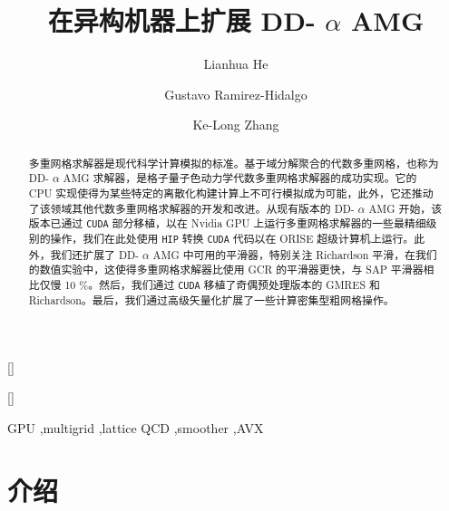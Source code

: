 \documentclass[5p,times,a4paper,fleqn]{cas-dc}
\begin{document}
   \let       \WriteBookmarks       \relax    
   \def       \floatpagepagefraction{1}    
   \def       \textpagefraction{.001}    
   \title[mode = title]{在异构机器上扩展 DD-  $\alpha$  AMG  }     

   \author[1]{Lianhua He}    []
   \fnmark    [1]
   \author[2]{Gustavo Ramirez-Hidalgo}    []
   \fnmark    [2]
   \author[1]{Ke-Long Zhang}    
   \cormark    [1]
   \fnmark    [1]

   \begin{abstract}多重网格求解器是现代科学计算模拟的标准。基于域分解聚合的代数多重网格，也称为 DD-   $\alpha$    AMG 求解器，是格子量子色动力学代数多重网格求解器的成功实现。它的 CPU 实现使得为某些特定的离散化构建计算上不可行模拟成为可能，此外，它还推动了该领域其他代数多重网格求解器的开发和改进。从现有版本的 DD-   $\alpha$    AMG 开始，该版本已通过    \texttt{CUDA}    部分移植，以在 Nvidia GPU 上运行多重网格求解器的一些最精细级别的操作，我们在此处使用    \texttt{HIP}    转换    \texttt{CUDA}    代码以在 ORISE 超级计算机上运行。此外，我们还扩展了 DD-   $\alpha$    AMG 中可用的平滑器，特别关注 Richardson 平滑，在我们的数值实验中，这使得多重网格求解器比使用 GCR 的平滑器更快，与 SAP 平滑器相比仅慢 10 \%。然后，我们通过    \texttt{CUDA}    移植了奇偶预处理版本的 GMRES 和 Richardson。最后，我们通过高级矢量化扩展了一些计算密集型粗网格操作。  \end{abstract}    
   \begin{keywords}
GPU \sep multigrid \sep lattice QCD \sep smoother \sep AVX
\end{keywords}     

   \maketitle     

   \section{介绍  }     
\end{document}

